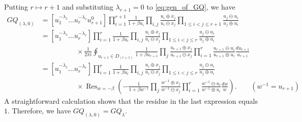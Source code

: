 \documentclass{amsart}
\begin{document}
Putting $r\mapsto r+1$ and substituting $\lambda_{r+1}=0$ to \eqref{eq:gen_of_GQ}, we have
\[
\begin{aligned}
GQ_{(\lambda,0)}
&
=[u_1^{-\lambda_1}\dots u_{r}^{-\lambda_r}u_{r+1}^0]
\prod_{i=1}^{r+1}\frac{1}{1+\beta u_i}
\prod_{i,j}\frac{u_i\oplus x_j}{u_i\ominus x_j}
\prod_{1\leq i<j\leq r+1}\frac{u_j\ominus u_i}{u_j\oplus u_i}\\
&=
[u_1^{-\lambda_1}\dots u_{r}^{-\lambda_r}]
\prod_{i=1}^{r}\frac{1}{1+\beta u_i}
\prod_{i,j}\frac{u_i\oplus x_j}{u_i\ominus x_j}
\prod_{1\leq i<j\leq r}\frac{u_j\ominus u_i}{u_j\oplus u_i}\\
&\hspace{5em}\times
\frac{1}{2\pi i}
\oint_{u_{r+1}\in D_{(r+1)}}
\frac{1}{1+\beta u_{r+1}}
\prod_j\frac{u_{r+1}\oplus x_j}{u_{r+1}\ominus x_j}
\prod_{i=1}^r\frac{u_{r+1}\ominus u_i}{u_{r+1}\oplus u_i}
\frac{du_{r+1}}{u_{r+1}}\\
&
=[u_1^{-\lambda_1}\dots u_{r}^{-\lambda_r}]
\prod_{i=1}^{r}\frac{1}{1+\beta u_i}
\prod_{i,j}\frac{u_i\oplus x_j}{u_i\ominus x_j}
\prod_{1\leq i<j\leq r}\frac{u_j\ominus u_i}{u_j\oplus u_i}\\
&\hspace{5em}
\times
\mathop{\mathrm{Res}}_{w=-\beta}
\left(
-\frac{1}{1+\beta w^{-1}}
\prod_j\frac{w^{-1}\oplus x_j}{w^{-1}\ominus x_j}
\prod_{i=1}^r\frac{w^{-1}\ominus u_i}{w^{-1}\oplus u_i}
\frac{dw}{w}
\right).\qquad (w^{-1}=u_{r+1})
\end{aligned}
\]
A straightforward calculation shows that the residue in the last expression equals $1$.
Therefore, we have $GQ_{(\lambda,0)}=GQ_\lambda$.
\end{document}
